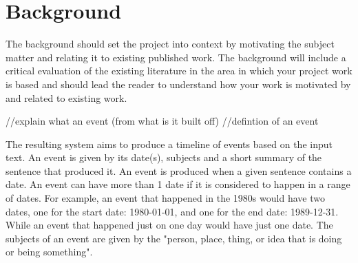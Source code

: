 \chapter{Background}
\par The background should set the project into context by motivating the subject matter and relating it to existing published work. The background will include a critical evaluation of the existing literature in the area in which your project work is based and should lead the reader to understand how your work is motivated by and related to existing work.

//explain what an event (from what is it built off) //defintion of an event
\par The resulting system aims to produce a timeline of events based on the input text. An event is given by its date(s), subjects and a short summary of the sentence that produced it. An event is produced when a given sentence contains a date. An event can have more than 1 date if it is considered to happen in a range of dates. For example, an event that happened in the 1980s would have two dates, one for the start date: 1980-01-01, and one for the end date: 1989-12-31. While an event that happened just on one day would have just one date. The subjects of an event are given by the "person, place, thing, or idea that is doing or being something"\cite{grammar}.

